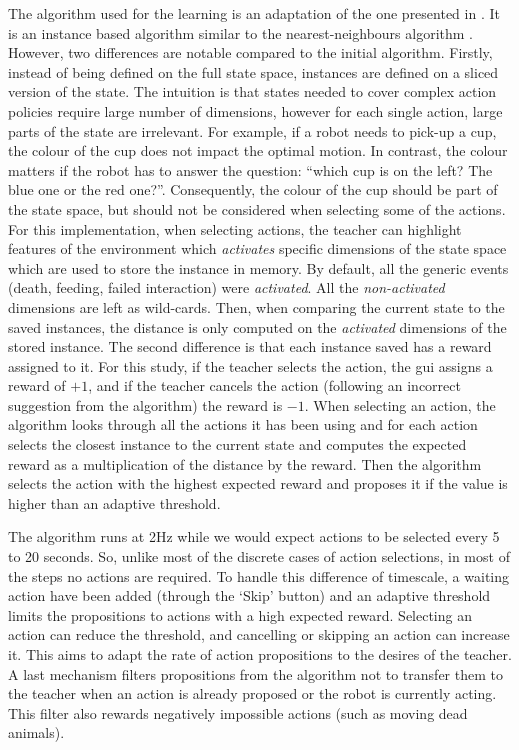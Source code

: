The algorithm used for the learning is an adaptation of the one presented in \cite{senft2017toward}. It is an instance based algorithm similar to the nearest-neighbours algorithm \cite{cover1967nearest}. However, two differences are notable compared to the initial algorithm. %
Firstly, instead of being defined on the full state space, instances are defined on a sliced version of the state. The intuition is that states needed to cover complex action policies require large number of dimensions, however for each single action, large parts of the state are irrelevant. For example, if a robot needs to pick-up a cup, the colour of the cup does not impact the optimal motion. In contrast, the colour matters if the robot has to answer the question: ``which cup is on the left? The blue one or the red one?''. Consequently, the colour of the cup should be part of the state space, but should not be considered when selecting some of the actions. For this implementation, when selecting actions, the teacher can highlight features of the environment which \emph{activates} specific dimensions of the state space which are used to store the instance in memory. By default, all the generic events (death, feeding, failed interaction) were \emph{activated}. All the \emph{non-activated} dimensions are left as wild-cards. Then, when comparing the current state to the saved instances, the distance is only computed on the \emph{activated} dimensions of the stored instance. The second difference is that each instance saved has a reward assigned to it. For this study, if the teacher selects the action, the \gls{gui} assigns a reward of $+1$, and if the teacher cancels the action (following an incorrect suggestion from the algorithm) the reward is $-1$. When selecting an action, the algorithm looks through all the actions it has been using and for each action selects the closest instance to the current state and computes the expected reward as a multiplication of the distance by the reward. Then the algorithm selects the action with the highest expected reward and proposes it if the value is higher than an adaptive threshold. 

The algorithm runs at 2Hz while we would expect actions to be selected every 5 to 20 seconds. So, unlike most of the discrete cases of action selections, in most of the steps no actions are required. To handle this difference of timescale, a waiting action have been added (through the `Skip' button) and an adaptive threshold limits the propositions to actions with a high expected reward. Selecting an action can reduce the threshold, and cancelling or skipping an action can increase it. This aims to adapt the rate of action propositions to the desires of the teacher. A last mechanism filters propositions from the algorithm not to transfer them to the teacher when an action is already proposed or the robot is currently acting. This filter also rewards negatively impossible actions (such as moving dead animals).

